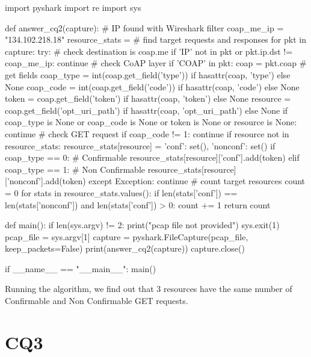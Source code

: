 \begin{python}
import pyshark
import re
import sys

def answer_cq2(capture):
    # IP found with Wireshark filter
    coap_me_ip = "134.102.218.18"
    resource_stats = {}
    # find target requests and responses
    for pkt in capture:
        try:
            # check destination is coap.me
            if 'IP' not in pkt or pkt.ip.dst != coap_me_ip:
                continue
            # check CoAP layer
            if 'COAP' in pkt:
                coap = pkt.coap
                # get fields 
                coap_type = int(coap.get_field('type')) if hasattr(coap, 'type') else None
                coap_code = int(coap.get_field('code')) if hasattr(coap, 'code') else None
                token = coap.get_field('token') if hasattr(coap, 'token') else None
                resource = coap.get_field('opt_uri_path') if hasattr(coap, 'opt_uri_path') else None                
                if coap_type is None or coap_code is None or token is None or resource is None:
                    continue
                # check GET request 
                if coap_code != 1:
                    continue
                if resource not in resource_stats:
                    resource_stats[resource] = {'conf': set(), 'nonconf': set()}
                if coap_type == 0:
                    # Confirmable
                    resource_stats[resource]['conf'].add(token)
                elif coap_type == 1:
                    # Non Confirmable
                    resource_stats[resource]['nonconf'].add(token)
        except Exception:
            continue
    # count target resources 
    count = 0
    for stats in resource_stats.values():
        if len(stats['conf']) == len(stats['nonconf']) and len(stats['conf']) > 0:
            count += 1
    return count

def main():
    if len(sys.argv) != 2:
        print("pcap file not provided")
        sys.exit(1)
    pcap_file = sys.argv[1]
    capture = pyshark.FileCapture(pcap_file, keep_packets=False)
    print(answer_cq2(capture))
    capture.close()

if __name__ == "__main__":
    main()
\end{python}

Running the algorithm, we find out that 3 resources have the same number of Confirmable and Non Confirmable GET requests.

\section{CQ3}
